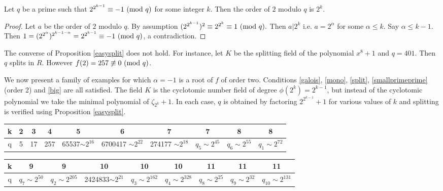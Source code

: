 \documentclass{llncs}
\newcommand{\MOD}[1]{~(\textup{mod}~#1)}
\renewcommand{\pmod}{\MOD}
\newcommand{\<}{\langle}
\renewcommand{\>}{\rangle}
\begin{document}
\begin{lemma} \label{order}
Let $q$ be a prime such that $2^{2^{k-1}} \equiv -1 \pmod q$ for some integer $k$. Then the order of $2$ modulo $q$ is $2^k$.
\end{lemma}

\begin{proof}
Let $a$ be the order of $2$ modulo $q$. By assumption $(2^{2^{k-1}})^2 \equiv 2^{2^k} \equiv 1 \pmod q.$ Then $a | 2^k$ i.e. $a=2^\alpha$ for some $\alpha \leq k.$ Say $\alpha \leq k-1.$ Then $1=(2^{2^\alpha})^{2^{k-1-\alpha}}= 2^{2^{k-1}} \equiv -1 \pmod q$, a contradiction.
\end{proof}

The converse of Proposition \ref{easysplit} does not hold. For instance, let $K$ be the splitting field of the polynomial $x^{8}+1$ and $q=401$. Then $q$ splits in $R$. However $f(2)=257 \not\equiv 0 \pmod q$.

We now present a family of examples for which $\alpha=-1$ is a root of $f$ of order two.  Conditions \ref{galois}, \ref{mono}, \ref{split}, \ref{smallprimeprime} (order 2) and \ref{big} are all satisfied.
The field $K$ is the cyclotomic number field of degree $\phi(2^k)=2^{k-1}$, but
instead of the cyclotomic polynomial we take the minimal polynomial of $\zeta_{2^k} + 1.$
In each case, $q$ is obtained by factoring $2^{2^{k-1}}+1$ for various values of $k$ and splitting is verified using Proposition \ref{easysplit}.



\begin{center}
        {\renewcommand{\arraystretch}{1.25}
         \setlength{\tabcolsep}{0.2em}
\begin{tabular}{|c||c|c|c|c|c|c|c|c|c|}
\hline k  & \hspace{0.12cm} 2 \hspace{0.12cm} & \hspace{0.14cm} 3\hspace{0.14cm} & 4 &  5  & 6& 7& 7& 8 & 8  \\
\hline q & 5 & 17 & 257 & 65537$\sim 2^{16}$ &  6700417 $\sim 2^{22}$  & 274177 $\sim 2^{18}$  &    $q_5\sim 2^{45}$ & $q_6\sim 2^{55}$ & $q_1\sim 2^{72}$ \\ \hline
\end{tabular}
\begin{tabular}{|c||c|c|c|c|c|c|c|c| }
\hline k   & 9 & 9 & 10 & 10 & 10& 11& 11& 11  \\
\hline q &  $q_7\sim 2^{50}$   &   $q_2 \sim 2^{205}$  & 2424833$\sim 2^{21}$  & $q_3\sim 2^{162}$  &  $q_4 \sim 2^{328}$ & $q_8\sim 2^{25} $ & $q_9\sim 2^{32}$ & $q_{10} \sim 2^{131}$\\ \hline
\end{tabular}}
\end{center}
\end{document}
